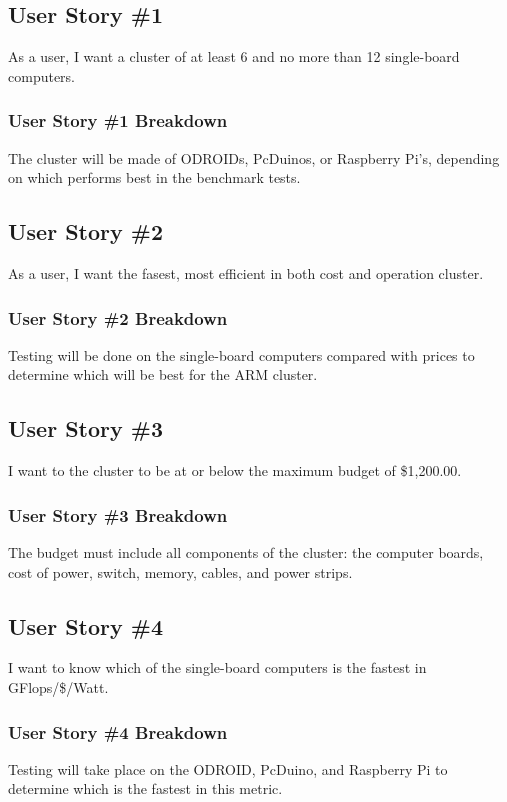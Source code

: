 
\subsection{User Story \#1}
As a user, I want a cluster of at least 6 and no more than 12 single-board computers.
\subsubsection{User Story \#1 Breakdown}
The cluster will be made of ODROIDs, PcDuinos, or Raspberry Pi's, depending on which performs best in the benchmark tests.

\subsection{User Story \#2} 
As a user, I want the fasest, most efficient in both cost and operation cluster.
\subsubsection{User Story \#2 Breakdown}
Testing will be done on the single-board computers compared with prices to determine which will be best for the ARM cluster.

\subsection{User Story \#3} 
I want to the cluster to be at or below the maximum budget of \$1,200.00.
\subsubsection{User Story \#3 Breakdown}
The budget must include all components of the cluster: the computer boards, cost of power, switch, memory, cables, and power strips.

\subsection{User Story \#4}
I want to know which of the single-board computers is the fastest in GFlops/\$/Watt.
\subsubsection{User Story \#4 Breakdown}
Testing will take place on the ODROID, PcDuino, and Raspberry Pi to determine which is the fastest in this metric. 

